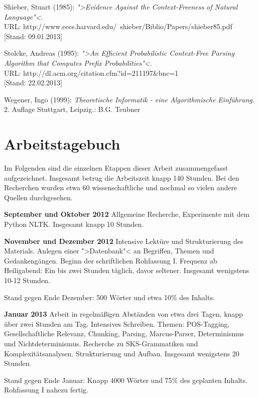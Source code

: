 \documentclass[12pt,a4paper]{article}
\theoremstyle{definition}
\begin{document}
\begin{thebibliography}{99}
		Shieber, Stuart (1985):
		\emph{">Evidence Against the Context-Freeness of Natural Language"<}.\\
		URL: http://www.eecs.harvard.edu/~shieber/Biblio/Papers/shieber85.pdf\\
		{[Stand: 09.01.2013]}
	
		Stolcke, Andreas (1995):
		\emph{">An Efficient Probabilistic Context-Free Parsing Algorithm that Computes Prefix Probabilities"<}.\\
		URL: http://dl.acm.org/citation.cfm?id=211197\&bnc=1\\
		{[Stand: 22.02.2013]}
	
		Wegener, Ingo (1999):
		\emph{Theoretische Informatik - eine Algorithmische Einführung.}
		2. Auflage
		Stuttgart, Leipzig.: B.G. Teubner

\end{thebibliography}

\onehalfspacing

\section{Arbeitstagebuch}
	Im Folgenden sind die einzelnen Etappen dieser Arbeit zusammengefasst aufgezeichnet. Insgesamt betrug die Arbeitszeit knapp 140 Stunden.
	Bei den Recherchen wurden etwa 60 wissenschaftliche und nochmal so vielen andere Quellen durchgesehen.

	\textbf{September und Oktober 2012}
		Allgemeine Recherche, Experimente mit dem Python NLTK.
		Insgesamt knapp 10 Stunden.

	\textbf{November und Dezember 2012}
		Intensive Lektüre und Strukturierung des Materials.
		Anlegen einer ">Datenbank"< an Begriffen, Themen und Gedankengängen.
		Beginn der schriftlichen Rohfassung I.
		Frequenz ab Heiligabend: Ein bis zwei Stunden täglich, davor seltener.
		Insgesamt wenigstens 10-12 Stunden.
		
		Stand gegen Ende Dezember: 500 Wörter und etwa 10\% des Inhalts.

	\textbf{Januar 2013}
		Arbeit in regelmäßigen Abständen von etwa drei Tagen, knapp über zwei Stunden am Tag.
		Intensives Schreiben. Themen: POS-Tagging, Gesellschaftliche Relevanz, Chunking, Parsing, Marcus-Parser, Determinismus und Nichtdeterminismus.
		Recherche zu SKS-Grammatiken und Komplexitätsanalysen.
		Strukturierung und Aufbau.
		Insgesamt wenigstens 20 Stunden.
		
		Stand gegen Ende Januar: Knapp 4000 Wörter und 75\% des geplanten Inhalts. Rohfassung I nahezu fertig.
		
\end{document}

